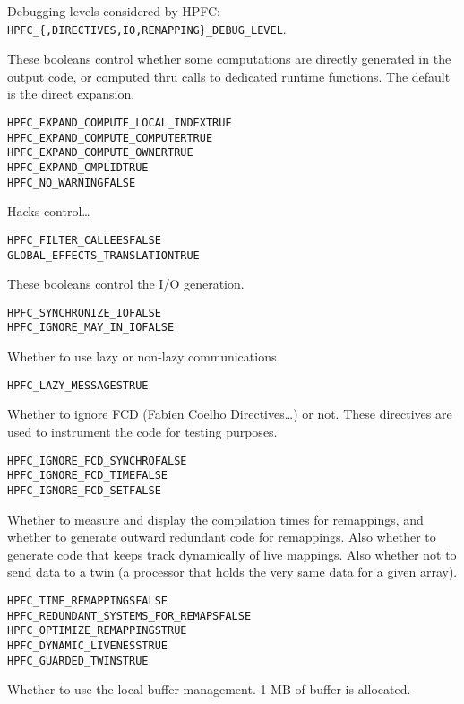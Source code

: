 \documentclass[a4paper]{report}
\newenvironment{PipsProp}{\begin{alltt}}{\end{alltt}}
\begin{document}
Debugging levels considered by HPFC:
\verb+HPFC_{,DIRECTIVES,IO,REMAPPING}_DEBUG_LEVEL+.

  These booleans control whether some computations are directly
generated in the output code, or computed thru calls to dedicated
runtime functions. The default is the direct expansion.

\begin{PipsProp}
HPFC_EXPAND_COMPUTE_LOCAL_INDEX TRUE
HPFC_EXPAND_COMPUTE_COMPUTER TRUE
HPFC_EXPAND_COMPUTE_OWNER TRUE
HPFC_EXPAND_CMPLID TRUE
HPFC_NO_WARNING FALSE
\end{PipsProp}

   Hacks control\ldots

\begin{PipsProp}
HPFC_FILTER_CALLEES FALSE
GLOBAL_EFFECTS_TRANSLATION TRUE
\end{PipsProp}

  These booleans control the I/O generation.

\begin{PipsProp}
HPFC_SYNCHRONIZE_IO FALSE
HPFC_IGNORE_MAY_IN_IO FALSE
\end{PipsProp}

  Whether to use lazy or non-lazy communications

\begin{PipsProp}
HPFC_LAZY_MESSAGES TRUE
\end{PipsProp}

Whether to ignore FCD (Fabien Coelho Directives\ldots) or not. These
directives are used to instrument the code for testing purposes.

\begin{PipsProp}
HPFC_IGNORE_FCD_SYNCHRO FALSE
HPFC_IGNORE_FCD_TIME FALSE
HPFC_IGNORE_FCD_SET FALSE
\end{PipsProp}

Whether to measure and display the compilation times for remappings,
and whether to generate outward redundant code for remappings. Also
whether to generate code that keeps track dynamically of live mappings.
Also whether not to send data to a twin (a processor that holds the very
same data for a given array).

\begin{PipsProp}
HPFC_TIME_REMAPPINGS FALSE
HPFC_REDUNDANT_SYSTEMS_FOR_REMAPS FALSE
HPFC_OPTIMIZE_REMAPPINGS TRUE
HPFC_DYNAMIC_LIVENESS TRUE
HPFC_GUARDED_TWINS TRUE
\end{PipsProp}

Whether to use the local buffer management. 1 MB of buffer is allocated.
\end{document}
